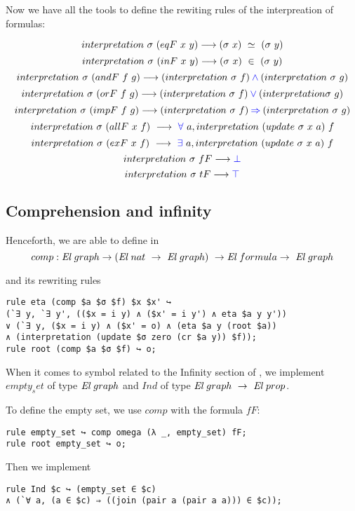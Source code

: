 \documentclass[a4paper]{article}
\begin{document}
Now we have all the tools to define the rewiting rules of the interpreation of formulas:

$$interpretation \ \sigma \ (eqF \ x \ y) \longrightarrow (\sigma \ x) \ \simeq \ (\sigma \ y)$$
$$interpretation \ \sigma \ (inF \ x \ y) \longrightarrow (\sigma \ x) \ \in \ (\sigma \ y)$$
$$interpretation \ \sigma \ (andF \ f \ g) \lra (interpretation \ \sigma \ f) \conj (interpretation \ \sigma \ g)$$
$$interpretation \ \sigma \ (orF \ f \ g) \longrightarrow (interpretation \ \sigma \ f) \mathbin{\color{blue} \vee}  (interpretation \sigma \ g)$$
$$interpretation \ \sigma \ (impF \ f \ g) \lra (interpretation \ \sigma \ f) \imp (interpretation \ \sigma \ g)$$
$$interpretation \ \sigma \ (allF \ x \ f) \ \lra \ \fa \ a, interpretation \ (update \ \sigma \ x \ a) \ f$$
$$interpretation \ \sigma \ (exF \ x \ f) \ \lra \ \ex \ a, interpretation \ (update \ \sigma \ x \ a) \ f$$
$$interpretation \ \sigma \ fF \longrightarrow {\color{blue} \bot}$$
$$interpretation \ \sigma \ tF \longrightarrow {\color{blue} \top}$$

\subsection{Comprehension and infinity}

Henceforth, we are able to define in \dedukti
$$comp : \El~graph \ra (\El \ nat \ \ra \ \El~graph) \  \ra \El \ formula \ra \ \El~graph$$

and its rewriting rules

\begin{lstlisting}
rule eta (comp $a $σ $f) $x $x' ↪ 
(`∃ y, `∃ y', (($x = i y) ∧ ($x' = i y') ∧ eta $a y y')) 
∨ (`∃ y, ($x = i y) ∧ ($x' = o) ∧ (eta $a y (root $a))
∧ (interpretation (update $σ zero (cr $a y)) $f));
rule root (comp $a $σ $f) ↪ o;
\end{lstlisting}

When it comes to symbol related to the Infinity section of \cite{zermodulo}, we implement $empty_set$ of type ${\mbox{\it El}}~graph$ and $Ind$ of type $\El~graph \ \ra \ \El~prop$.

To define the empty set, we use $comp$ with the formula $fF$:
\begin{lstlisting}
rule empty_set ↪ comp omega (λ _, empty_set) fF;
rule root empty_set ↪ o;
\end{lstlisting}

Then we implement

\begin{lstlisting}
rule Ind $c ↪ (empty_set ∈ $c) 
∧ (`∀ a, (a ∈ $c) ⇒ ((join (pair a (pair a a))) ∈ $c));
\end{lstlisting}
\end{document}
